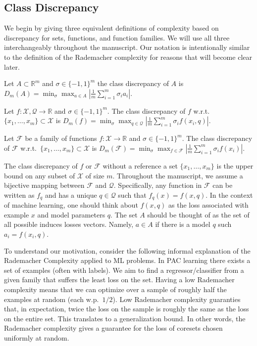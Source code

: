 \documentclass[12pt]{colt2019} %
\newcommand{\R}{\mathbb{R}}
\newcommand{\F}{\mathcal{F}}
\newcommand{\X}{\mathcal{X}}
\newcommand{\Q}{\mathcal{Q}}
\begin{document}
\subsection{Class Discrepancy}
We begin by giving three equivalent definitions of complexity based on discrepancy for sets, functions, and function families. We will use all three interchangeably throughout the manuscript. 
Our notation is intentionally similar to the definition of the Rademacher complexity for reasons that will become clear later.

\begin{definition} \label{cd1}
Let $A \subset \R^m$ and $\sigma \in \{-1,1\}^m$ the class discrepancy of $A$ is 
$
D_m(A)  = \min_\sigma \max_{a\in A} \left| \frac{1}{m} \sum_{i=1}^{m}  \sigma_i  a_i\right| 
$.
\end{definition}
%
\begin{definition}\label{cd2}
Let $f:\X,\Q\rightarrow\R$ and $\sigma \in \{-1,1\}^m$. 
The class discrepancy of $f$ w.r.t.\ $\{x_1,\ldots,x_m\} \subset \X$ is 
$
D_m(f) =  \min_{\sigma} \max_{q \in \Q}  \left|\frac{1}{m} \sum_{i=1}^{m}\sigma_i f(x_i,q)\right|
$.
\end{definition}
%
\begin{definition}\label{cd3}
Let $\F$ be a family of functions $f:\X\rightarrow\R$ and $\sigma \in \{-1,1\}^m$. 
The class discrepancy of $\F$ w.r.t.\ $\{x_1,\ldots,x_m\} \subset \X$ is 
$
D_m(\F) =  \min_{\sigma} \max_{f \in \F}  \left| \frac{1}{m} \sum_{i=1}^{m}\sigma_i f(x_i)\right|
$.
\end{definition}
The class discrepancy of $f$ or $\F$ without a reference a set $\{x_1,\ldots,x_m\}$ is the upper bound on any subset of $\X$ of size $m$.
Throughout the manuscript, we assume a bijective mapping between $\F$ and $\Q$. 
Specifically, any function in $\F$ can be written as $f_q$ and has a unique $q \in \Q$ such that $f_q(x)=f(x,q)$. 
In the context of machine learning, one should think about $f(x,q)$ as the loss associated with example $x$ and model parameters $q$.
The set $A$ should be thought of as the set of all possible induces losses vectors. 
Namely, $a\in A$ if there is a model $q$ such $a_i = f(x_i,q)$.

To understand our motivation, consider the following informal explanation of the Rademacher Complexity applied to ML problems. 
In PAC learning there exists a set of examples (often with labels).
We aim to find a regressor/classifier from a given family that suffers the least loss on the set. 
Having a low Rademacher complexity means that we can optimize over a sample of roughly half the examples at random (each w.p.\ $1/2$).
Low Rademacher complexity guaranties that, in expectation, twice the loss on the sample is roughly the same as the loss on the entire set.
This translates to a generalization bound. 
In other words, the Rademacher complexity gives a guarantee for the loss of coresets chosen uniformly at random.
\end{document}

